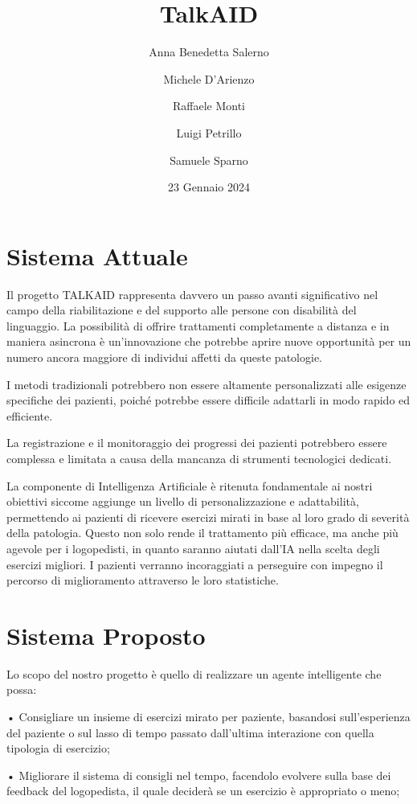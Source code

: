 \documentclass{article}
\title{TalkAID}
\author{
    Anna Benedetta Salerno\\
    \and
    Michele D'Arienzo\\
    \and
    Raffaele Monti\\
    \and
    Luigi Petrillo\\
    \and
    Samuele Sparno\\
}
\date{23 Gennaio 2024}
\begin{document}
    \maketitle

    \section{Sistema Attuale}

    Il progetto TALKAID rappresenta davvero un passo avanti significativo nel campo della riabilitazione e del supporto alle persone con disabilità del
    linguaggio. La possibilità di offrire trattamenti completamente a distanza e in maniera asincrona è un'innovazione che potrebbe aprire nuove opportunità
    per un numero ancora maggiore di individui affetti da queste patologie.

    I metodi tradizionali potrebbero non essere altamente personalizzati alle esigenze specifiche dei pazienti, poiché potrebbe essere difficile adattarli in
    modo rapido ed efficiente.

    La registrazione e il monitoraggio dei progressi dei pazienti potrebbero essere complessa e limitata a causa della mancanza di strumenti tecnologici
    dedicati.

    La componente di Intelligenza Artificiale è ritenuta fondamentale ai nostri obiettivi siccome aggiunge un livello di personalizzazione e adattabilità,
    permettendo ai pazienti di ricevere esercizi mirati in base al loro grado di severità della patologia. Questo non solo rende il trattamento più efficace,
    ma anche più agevole per i logopedisti, in quanto saranno aiutati dall'IA nella scelta degli esercizi migliori. I pazienti verranno incoraggiati a
    perseguire con impegno il percorso di miglioramento attraverso le loro statistiche.

    \section{Sistema Proposto}

    Lo scopo del nostro progetto è quello di realizzare un agente intelligente che possa:

    • Consigliare un insieme di esercizi mirato per paziente, basandosi sull'esperienza del paziente o sul lasso di tempo passato dall'ultima interazione con
    quella tipologia di esercizio;

    • Migliorare il sistema di consigli nel tempo, facendolo evolvere sulla base dei feedback del logopedista, il quale deciderà se un esercizio è appropriato
    o meno;
\end{document}
